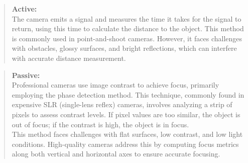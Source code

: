 \begin{quote}
    \textbf{Active:}  
    \\The camera emits a signal and measures the time it takes for the signal to return, using this time to calculate the distance to the object. 
    This method is commonly used in point-and-shoot cameras. 
    However, it faces challenges with obstacles, glossy surfaces, and bright reflections, which can interfere with accurate distance measurement.
\end{quote}
\begin{quote}
    \textbf{Passive:}
    \\Professional cameras use image contrast to achieve focus, primarily employing the phase detection method. 
    This technique, commonly found in expensive SLR (single-lens reflex) cameras, involves analyzing a strip of pixels to assess contrast levels. 
    If pixel values are too similar, the object is out of focus; if the contrast is high, the object is in focus.
    \\
    This method faces challenges with flat surfaces, low contrast, and low light conditions. 
    High-quality cameras address this by computing focus metrics along both vertical and horizontal axes to ensure accurate focusing.
\end{quote}
